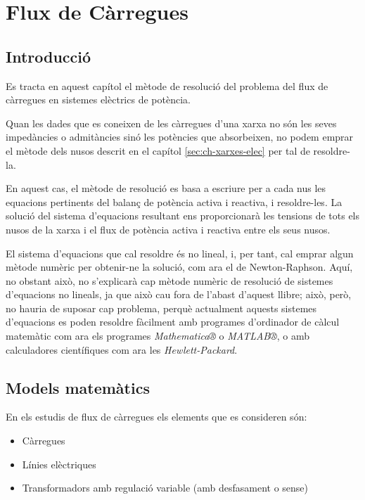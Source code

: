 \chapter{Flux de Càrregues}
\label{sec:ch-flux-carregues}

\section{Introducció}

Es tracta en aquest capítol el mètode de resolució del problema del flux de càrregues en
sistemes elèctrics de potència.

Quan les dades que es coneixen de les càrregues d'una xarxa no són
les seves impedàncies o admitàncies sinó les potències que
absorbeixen, no podem emprar el mètode dels nusos descrit en el
capítol \ref{sec:ch-xarxes-elec} per tal de resoldre-la.

En aquest cas, el mètode de resolució es basa a escriure per a cada
nus les equacions pertinents del balanç de potència activa i
reactiva, i resoldre-les. La solució del sistema d'equacions
resultant ens proporcionarà les tensions de tots els nusos de la
xarxa i el flux de potència activa i reactiva entre els seus nusos.

El sistema d'equacions que cal resoldre és no lineal, i, per tant,
cal emprar algun mètode numèric per obtenir-ne la solució, com ara el
de Newton-Raphson.  Aquí, no obstant això, no
s'explicarà cap mètode numèric de resolució de sistemes d'equacions
no lineals, ja que això cau fora de l'abast d'aquest llibre; això, però,  no hauria de suposar cap problema, perquè actualment aquests
sistemes d'equacions es poden resoldre fàcilment amb programes
d'ordinador de càlcul matemàtic com ara els programes
\emph{Mathematica®} o \emph{MATLAB®}, o amb calculadores
científiques com ara les \emph{Hewlett-Packard}.

\section{Models matemàtics} 

En els estudis de flux de càrregues els elements que es consideren són:
\begin{itemize}
   \item Càrregues
   \item Línies elèctriques
   \item Transformadors amb regulació variable (amb desfasament o sense)
\end{itemize}

